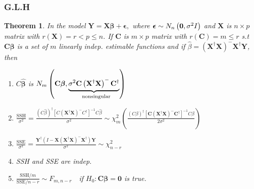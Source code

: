 \documentclass{article}
\newtheorem{theorem}{Theorem}
\begin{document}
\bigskip

\bigskip

\subsubsection{G.L.H}

\begin{theorem}
In the model $\mathbf{Y}=\mathbf{X\beta +\epsilon ,}$ where $\mathbf{%
\epsilon }\sim N_{n}\left( \mathbf{0},\sigma ^{2}I\right) $ and $\mathbf{X}$
is $n\times p$ matrix with $r\left( \mathbf{X}\right) =r<p\leq n$. If $%
\mathbf{C}$ is $m\times p$ matrix with $r\left( \mathbf{C}\right) =m\leq r$
s.t $\mathbf{C\beta }$ is a set of $m$ linearly indep. estimable functions
and if $\hat{\beta}=\left( \mathbf{X}^{\dagger }\mathbf{X}\right) ^{-}%
\mathbf{X}^{\dagger }\mathbf{Y}$, then

\begin{enumerate}
\item $C\mathbf{\hat{\beta}}$ is $N_{m}\left( \mathbf{C\beta },\underset{%
\text{nonsingular}}{\underbrace{\sigma ^{2}\mathbf{C}\left( \mathbf{X}%
^{\dagger }\mathbf{X}\right) ^{-}\mathbf{C}^{\dagger }}}\right) $

\item $\frac{\text{SSH}}{\sigma ^{2}}=\frac{\left( C\hat{\beta}\right)
^{\dagger }\left[ C\left( \mathbf{X}^{\dagger }\mathbf{X}\right)
^{-}C^{\dagger }\right] ^{-1}C\hat{\beta}}{\sigma ^{2}}\sim \chi
_{m}^{2}\left( \frac{\left( C\beta \right) ^{\dagger }\left[ \mathbf{C}%
\left( \mathbf{X}^{\dagger }\mathbf{X}\right) ^{-}\mathbf{C}^{\dagger }%
\right] ^{-1}C\beta }{2\sigma ^{2}}\right) $

\item $\frac{\text{SSE}}{\sigma ^{2}}=\frac{\mathbf{Y}^{\dagger }\left( I-%
\mathbf{X}\left( \mathbf{X}^{\dagger }\mathbf{X}\right) ^{-}\mathbf{X}%
^{\dagger }\right) \mathbf{Y}}{\sigma ^{2}}\sim \chi _{n-r}^{2}$

\item SSH and SSE are indep.

\item $\frac{\text{SSH}/m}{\text{SSE}/n-r}\sim F_{m,n-r}\quad $if $H_{0}:%
\mathbf{C\beta =0}$ is true.
\end{enumerate}


\end{theorem}
\end{document}

